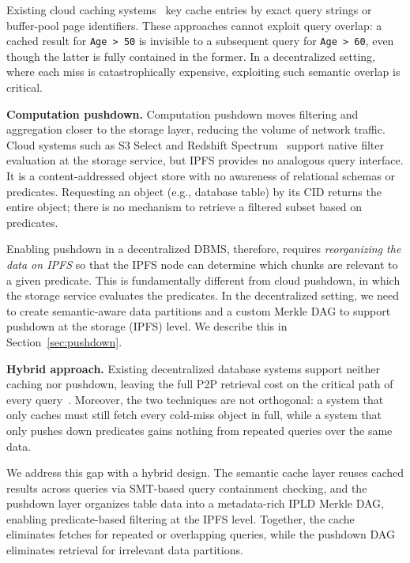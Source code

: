 Existing cloud caching systems~\cite{dageville2016snowflake, melnik2010dremel, fitzpatrick2004distributed} key cache entries by exact query strings or buffer-pool page identifiers. These approaches cannot exploit query overlap: a cached result for \texttt{Age > 50} is invisible to a subsequent query for \texttt{Age > 60}, even though the latter is fully contained in the former. In a decentralized setting, where each miss is catastrophically expensive, exploiting such semantic overlap is critical.
 
\textbf{Computation pushdown.}
Computation pushdown moves filtering and aggregation closer to the storage layer, reducing the volume of network traffic. Cloud systems such as S3 Select and Redshift Spectrum~\cite{yang2021flexpushdowndb} support native filter evaluation at the storage service, but IPFS provides no analogous query interface. It is a content-addressed object store with no awareness of relational schemas or predicates. Requesting an object (e.g., database table) by its CID returns the entire object; there is no mechanism to retrieve a filtered subset based on predicates.
 
Enabling pushdown in a decentralized DBMS, therefore, requires \emph{reorganizing the data on IPFS} so that the IPFS node can determine which chunks are relevant to a given predicate. This is fundamentally different from cloud pushdown, in which the storage service evaluates the predicates. In the decentralized setting, we need to create semantic-aware data partitions and a custom Merkle DAG to support pushdown at the storage (IPFS) level. We describe this in Section~\ref{sec:pushdown}.
 
\textbf{Hybrid approach.}
Existing decentralized database systems support neither caching nor pushdown, leaving the full P2P retrieval cost on the critical path of every query~\cite{hossain2025mtdb, mukherjee2025web3db, yao2024minerva}. Moreover, the two techniques are not orthogonal: a system that only caches must still fetch every cold-miss object in full, while a system that only pushes down predicates gains nothing from repeated queries over the same data. 

We address this gap with a hybrid design. The semantic cache layer reuses cached results across queries via SMT-based query containment checking, and the pushdown layer organizes table data into a metadata-rich IPLD Merkle DAG, enabling predicate-based filtering at the IPFS level. Together, the cache eliminates fetches for repeated or overlapping queries, while the pushdown DAG eliminates retrieval for irrelevant data partitions.


